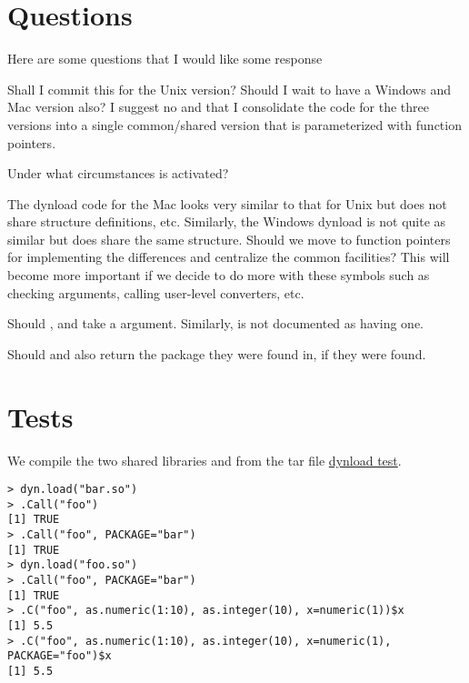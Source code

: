 \documentclass{article}
\begin{document}
\section{Questions}
Here are some questions that I would like some response
\begin{description}
\item Shall I commit this for the Unix version? Should I wait to
 have a Windows and Mac version also?
 I suggest no and that I consolidate the code for the three versions
 into a single common/shared version that is parameterized with 
 function pointers.

\item Under what circumstances is  activated?
\item The dynload code for the Mac looks very similar to that for
  Unix but does not share structure definitions, etc. 
  Similarly, the Windows dynload is not quite as similar but does
  share the same structure. Should we move to function pointers for
  implementing the differences and centralize the common facilities?
  This will become more important if we decide to do more with 
  these symbols such as checking arguments, calling user-level
  converters, etc.

\item Should ,  and
 take a  argument.
Similarly, 
 is not documented as having one.

Should  and  also return 
the package they were found in,  if they were found.

\end{description}


\section{Tests}

We compile the two shared libraries  and
 from the tar file \href{http://www.omegahat.org/Dynload.tar.gz}{dynload
test}.

\begin{verbatim}
> dyn.load("bar.so")
> .Call("foo")
[1] TRUE
> .Call("foo", PACKAGE="bar")
[1] TRUE
> dyn.load("foo.so")
> .Call("foo", PACKAGE="bar")
[1] TRUE
> .C("foo", as.numeric(1:10), as.integer(10), x=numeric(1))$x
[1] 5.5
> .C("foo", as.numeric(1:10), as.integer(10), x=numeric(1), PACKAGE="foo")$x
[1] 5.5
\end{verbatim}
\end{document}
